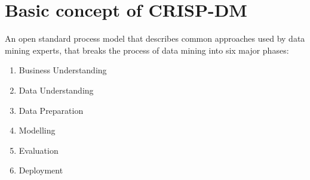\documentclass[a4paper,12pt,answers]{article}
\begin{document}
	\section{Basic concept of CRISP-DM}
	An open standard process model that describes common approaches used by data mining experts, that breaks the process of data mining into six major phases:
	\begin{enumerate}
		\item Business Understanding
		\item Data Understanding
		\item Data Preparation
		\item Modelling
		\item Evaluation
		\item Deployment
	\end{enumerate}
\end{document}
